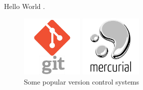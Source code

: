 \documentclass{article}
\begin{document}
Hello World \cite{ref1}.

\begin{figure}
  \begin{minipage}{.45\linewidth}
    \centering
    \includegraphics[width=3cm]{img/git-logo}
  \end{minipage}
  \begin{minipage}{.45\linewidth}
    \centering
    \includegraphics[width=3cm]{img/hg-logo}
  \end{minipage}
  \caption{Some popular version control systems}
\end{figure}





\end{document}
